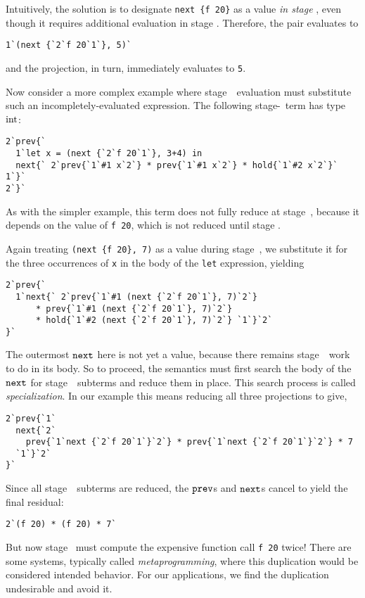 Intuitively, the solution is to designate \verb|next {f 20}| as a value
\emph{in stage \bbone}, even though it requires additional evaluation in stage
\bbtwo. Therefore, the pair evaluates to
\begin{lstlisting}
1`(next {`2`f 20`1`}, 5)`
\end{lstlisting}
and the projection, in turn, immediately evaluates to \verb|5|.

Now consider a more complex example where stage~\bbone\ evaluation must
substitute such an incompletely-evaluated expression. The following
stage-\bbtwo\ term has type ${\rm int}$:
\begin{lstlisting} 
2`prev{`
  1`let x = (next {`2`f 20`1`}, 3+4) in
  next{` 2`prev{`1`#1 x`2`} * prev{`1`#1 x`2`} * hold{`1`#2 x`2`}` 1`}`
2`}`
\end{lstlisting}
As with the simpler example, this term does not fully reduce at stage~\bbone, 
because it depends on the value of \verb|f 20|, which is not reduced until stage \bbtwo.

Again treating \verb|(next {f 20}, 7)| as a value during stage~\bbone, we
substitute it for the three occurrences of \verb|x| in the body of the
\verb|let| expression, yielding
\begin{lstlisting} 
2`prev{`
  1`next{` 2`prev{`1`#1 (next {`2`f 20`1`}, 7)`2`} 
      * prev{`1`#1 (next {`2`f 20`1`}, 7)`2`} 
      * hold{`1`#2 (next {`2`f 20`1`}, 7)`2`} `1`}`2`
}`
\end{lstlisting}
The outermost ${\tt next}$ here is not yet a value, because there remains stage~\bbone\ work to do in its body.
So to proceed, the semantics must first search the body of the ${\tt next}$ for stage~\bbone\ subterms and reduce them in place.
This search process is called {\em specialization}.
In our example this means reducing all three projections to give,
\begin{lstlisting} 
2`prev{`1`
  next{`2` 
    prev{`1`next {`2`f 20`1`}`2`} * prev{`1`next {`2`f 20`1`}`2`} * 7 
  `1`}`2`
}`
\end{lstlisting}
Since all stage~\bbone\ subterms are reduced, the ${\tt prev}$s and ${\tt next}$s cancel to yield the final residual:
\begin{lstlisting} 
2`(f 20) * (f 20) * 7`
\end{lstlisting}
But now stage \bbtwo\ must compute the expensive function call \verb|f 20| twice! 
There are some systems, typically called {\em metaprogramming}, 
where this duplication would be considered intended behavior.
For our applications, we find the duplication undesirable and avoid it.

